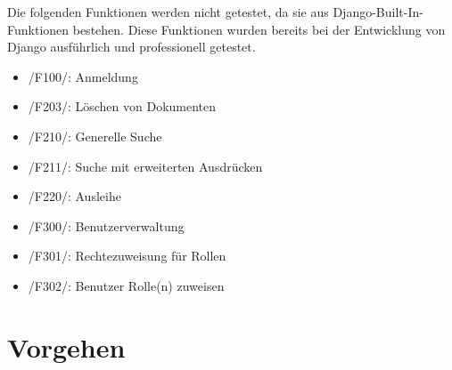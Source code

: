 Die folgenden Funktionen werden nicht getestet, da sie aus
Django-Built-In-Funktionen bestehen. Diese Funktionen wurden bereits bei der
Entwicklung von Django ausführlich und professionell getestet.

\begin{itemize}
\item /F100/: Anmeldung
\item /F203/: Löschen von Dokumenten
\item /F210/: Generelle Suche
\item /F211/: Suche mit erweiterten Ausdrücken
\item /F220/: Ausleihe
\item /F300/: Benutzerverwaltung
\item /F301/: Rechtezuweisung für Rollen
\item /F302/: Benutzer Rolle(n) zuweisen
\end{itemize}

\section{Vorgehen}



